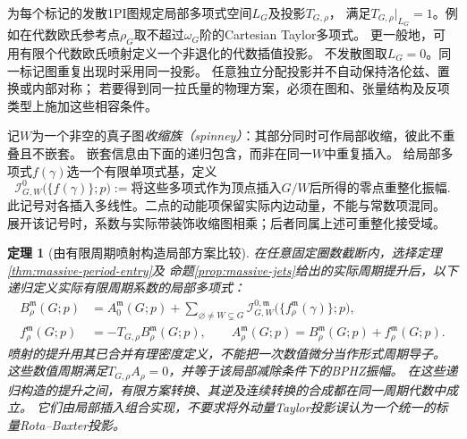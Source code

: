 \documentclass[11pt,a4paper]{ctexart}
\theoremstyle{cnplain}\newtheorem{theorem}{定理}[section]
\theoremstyle{definition}\newtheorem{definition}[theorem]{定义}
\theoremstyle{remark}\newtheorem{remark}[theorem]{注}
\begin{document}
为每个标记的发散1PI图规定局部多项式空间$L_G$及投影$T_{G,\rho}$，
满足$T_{G,\rho}|_{L_G}=1$。例如在代数欧氏参考点$\rho_G$取不超过$\omega_G$阶的Cartesian Taylor多项式。
更一般地，可用有限个代数欧氏喷射定义一个非退化的代数插值投影。
不发散图取$L_G=0$。同一标记图重复出现时采用同一投影。
任意独立分配投影并不自动保持洛伦兹、置换或内部对称；
若要得到同一拉氏量的物理方案，必须在图和、张量结构及反项类型上施加这些相容条件。

记$W$为一个非空的真子图\emph{收缩族（spinney）}：其部分同时可作局部收缩，彼此不重叠且不嵌套。
嵌套信息由下面的递归包含，而非在同一$W$中重复插入。
给局部多项式$f(\gamma)$选一个有限单项式基，定义
\[
 \mathcal I^0_{G,W}\bigl(\{f(\gamma)\};p\bigr)
 :=\text{将这些多项式作为顶点插入$G/W$后所得的零点重整化振幅}.
\]
此记号对各插入多线性。二点的动能项保留实际内边动量，不能与常数项混同。
展开该记号时，系数与实际带装饰收缩图相乘；后者同属上述可重整化接受域。

\begin{theorem}[由有限周期喷射构造局部方案比较]
\label{thm:massive-finite-scheme}
在任意固定圈数截断内，选择定理\ref{thm:massive-period-entry}及
命题\ref{prop:massive-jets}给出的实际周期提升后，以下递归定义实际有限周期系数的局部多项式：
\begin{align}
 B_\rho^{\mathfrak m}(G;p)
 &=A_0^{\mathfrak m}(G;p)
   +\sum_{\varnothing\ne W\subsetneq G}
    \mathcal I^{0,\mathfrak m}_{G,W}
       \bigl(\{f_\rho^{\mathfrak m}(\gamma)\};p\bigr),
       \label{eq:massive-finite-preparation}\\
 f_\rho^{\mathfrak m}(G;p)&=-T_{G,\rho}B_\rho^{\mathfrak m}(G;p),
 \qquad
 A_\rho^{\mathfrak m}(G;p)=B_\rho^{\mathfrak m}(G;p)+f_\rho^{\mathfrak m}(G;p).
 \label{eq:massive-finite-recursion}
\end{align}
喷射的提升用其已合并有理密度定义，不能把一次数值微分当作形式周期导子。
这些数值周期满足$T_{G,\rho}A_\rho=0$，并等于该局部减除条件下的BPHZ振幅。
在这些\emph{递归构造的提升}之间，有限方案转换、其逆及连续转换的合成都在同一周期代数中成立。
它们由局部插入组合实现，不要求将外动量Taylor投影误认为一个统一的标量Rota--Baxter投影。
\end{theorem}
\end{document}
